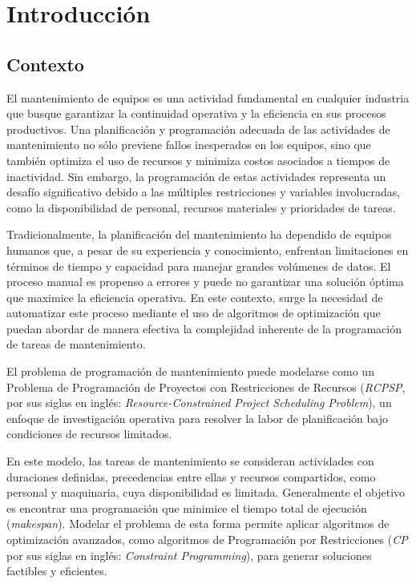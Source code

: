 \documentclass{article}
\begin{document}
\tableofcontents
\newpage

\section{Introducción}

\subsection{Contexto}
El mantenimiento de equipos es una actividad fundamental en cualquier industria que busque garantizar la continuidad operativa y la eficiencia en sus procesos productivos. Una planificación y programación adecuada de las actividades de mantenimiento no sólo previene fallos inesperados en los equipos, sino que también optimiza el uso de recursos y minimiza costos asociados a tiempos de inactividad. Sin embargo, la programación de estas actividades representa un desafío significativo debido a las múltiples restricciones y variables involucradas, como la disponibilidad de personal, recursos materiales y prioridades de tareas.

Tradicionalmente, la planificación del mantenimiento ha dependido de equipos humanos que, a pesar de su experiencia y conocimiento, enfrentan limitaciones en términos de tiempo y capacidad para manejar grandes volúmenes de datos. El proceso manual es propenso a errores y puede no garantizar una solución óptima que maximice la eficiencia operativa. En este contexto, surge la necesidad de automatizar este proceso mediante el uso de algoritmos de optimización que puedan abordar de manera efectiva la complejidad inherente de la programación de tareas de mantenimiento.

El problema de programación de mantenimiento puede modelarse como un Problema de Programación de Proyectos con Restricciones de Recursos (\textit{RCPSP}, por sus siglas en inglés: \textit{Resource-Constrained Project Scheduling Problem}), un enfoque de investigación operativa para resolver la labor de planificación bajo condiciones de recursos limitados.

En este modelo, las tareas de mantenimiento se consideran actividades con duraciones definidas, precedencias entre ellas y recursos compartidos, como personal y maquinaria, cuya disponibilidad es limitada. Generalmente el objetivo es encontrar una programación que minimice el tiempo total de ejecución (\textit{makespan}). Modelar el problema de esta forma permite aplicar algoritmos de optimización avanzados, como algoritmos de Programación por Restricciones (\textit{CP} por sus siglas en inglés: \textit{Constraint Programming}), para generar soluciones factibles y eficientes.
\end{document}
